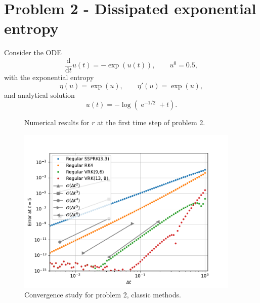 \documentclass{report}
\renewcommand{\exp}[1]{\operatorname{e}^{#1}}
\newcommand{\expalt}{\operatorname{exp}}
\begin{document}
\section{Problem 2 - Dissipated exponential entropy}
    Consider the ODE
    \[\frac{\text{d}}{\text{d}t} u(t) = -\expalt(u(t)), \qquad u^0 = 0.5,\]
    with the exponential entropy
    \[\eta(u) = \expalt(u), \qquad \eta'(u) = \expalt(u),\]
    and analytical solution
    \[u(t) = -\log(\exp{-1/2}+t).\]

    \begin{figure}[H]
        \centering
        \hfill
        \hfill
        \caption{Numerical results for \(r\) at the first time step of problem 2.} \label{Fig3}
    \end{figure}

    \begin{figure}[H]
        \centering
        \includegraphics[width=0.95\textwidth]{figs/P2_Regular_RK4.pdf}
        \caption{Convergence study for problem 2, classic methods.}
        \label{Fig4a}
    \end{figure}
\end{document}
